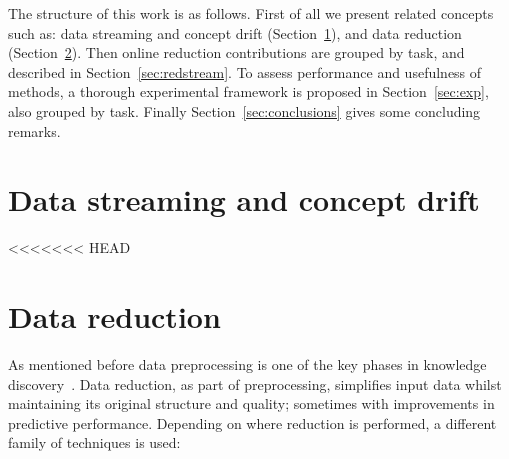 \documentclass[preprint,12pt]{elsarticle}
\begin{document}
The structure of this work is as follows. First of all we present related concepts such as: data streaming and concept drift (Section~\ref{sec:stream}), and data reduction (Section~\ref{sec:datared}). Then online reduction contributions are grouped by task, and described in Section~\ref{sec:redstream}. To assess performance and usefulness of methods, a thorough experimental framework is proposed in Section~\ref{sec:exp}, also grouped by task. Finally Section~\ref{sec:conclusions} gives some concluding remarks.

\section{Data streaming and concept drift}
\label{sec:stream}
<<<<<<< HEAD

\section{Data reduction}
\label{sec:datared}

As mentioned before data preprocessing is one of the key phases in knowledge discovery~\cite{garcia16b}. Data reduction, as part of preprocessing, simplifies input data whilst maintaining its original structure and quality; sometimes with improvements in predictive performance. Depending on where reduction is performed, a different family of techniques is used:
\end{document}
